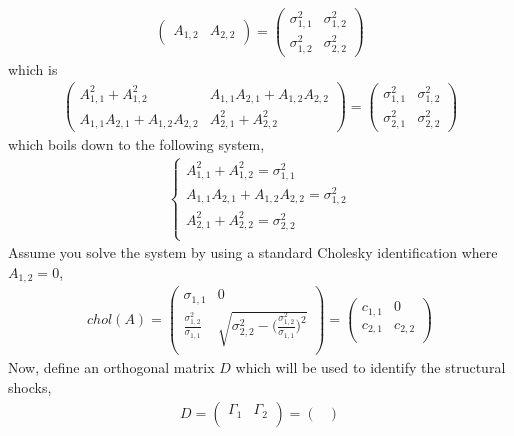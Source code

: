 \documentclass[14pt]{article}
\begin{document}
{\begin{eqnarray}
\begin{pmatrix}
A_{1,2} & A_{2,2}
\end{pmatrix}  = \begin{pmatrix}
\sigma^2_{1,1} & \sigma^2_{1,2} \\
\sigma^2_{1,2} & \sigma^2_{2,2}
\end{pmatrix}
\end{eqnarray}
which is
\begin{eqnarray}
\begin{pmatrix}
A_{1,1}^2 + A_{1,2}^2 & A_{1,1} A_{2,1} + A_{1,2} A_{2,2}  \\
A_{1,1} A_{2,1} + A_{1,2} A_{2,2}  & A_{2,1}^2 + A_{2,2}^2
\end{pmatrix} = \begin{pmatrix}
\sigma^2_{1,1} & \sigma^2_{1,2} \\
\sigma^2_{2,1} & \sigma^2_{2,2}
\end{pmatrix}
\end{eqnarray}
which boils down to the following system,
\begin{eqnarray}
\begin{cases}
A_{1,1}^2 + A_{1,2}^2 = \sigma^2_{1,1} \\
A_{1,1} A_{2,1} + A_{1,2} A_{2,2} = \sigma^2_{1,2} \\
A_{2,1}^2 + A_{2,2}^2 = \sigma^2_{2,2} \\
\end{cases}
\end{eqnarray}
Assume you solve the system by using a standard Cholesky identification where $A_{1,2} = 0$,
\begin{eqnarray}
chol(A) = \begin{pmatrix}
\sigma_{1,1} & 0 \\
\frac{\sigma_{1,2}^2}{\sigma_{1,1}} & \sqrt{\sigma_{2,2}^2 - \Big( \frac{\sigma_{1,2}^2}{\sigma_{1,1}} \Big)^2} \\
\end{pmatrix} = \begin{pmatrix}
c_{1,1} & 0 \\
c_{2,1} & c_{2,2} \\
\end{pmatrix}
\end{eqnarray}
Now, define an orthogonal matrix $D$ which will be used to identify the structural shocks,
\begin{eqnarray}
D = \begin{pmatrix}
\Gamma_{1} & \Gamma_{2} \\
\end{pmatrix} = \begin{pmatrix}

\end{pmatrix}
\end{eqnarray}}
\end{document}

